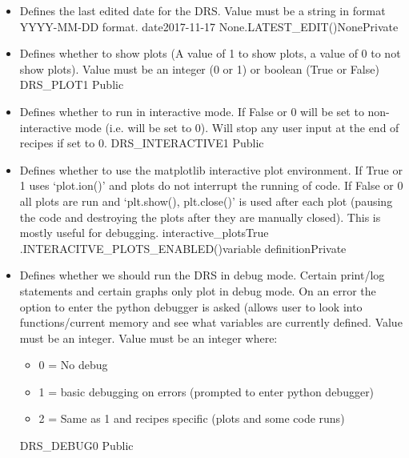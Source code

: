 \begin{itemize}
\ifdevguide
\item {}
{Defines the last edited date for the DRS. Value must be a string in format YYYY-MM-DD format.}
{date}{2017-11-17}
{None}{\spirouConst.LATEST\_EDIT()}{None}{Private}
\fi


\item {} 
{Defines whether to show plots (A value of 1 to show plots, a value of 0 to not show plots). Value must be an integer (0 or 1) or boolean (True or False)}
{DRS\_PLOT}{1}
{\AllRecipes}{\configtxtfile}{\AllRecipes}{Public}

\item {} 
{Defines whether to run in interactive mode. If False or 0 will be set to non-interactive mode (i.e.  will be set to 0). Will stop any user input at the end of recipes if set to 0.}
{DRS\_INTERACTIVE}{1}
{\AllRecipes}{\configtxtfile}{\AllRecipes}{Public}

\ifdevguide
\item {}
{Defines whether to use the matplotlib interactive plot environment. If True or 1 uses `plot.ion()' and plots do not interrupt the running of code. If False or 0 all plots are run and `plt.show(), plt.close()' is used after each plot (pausing the code and destroying the plots after they are manually closed). This is mostly useful for debugging.}
{interactive\_plots}{True}
{\spirouPlot}{\spirouConst.INTERACITVE\_PLOTS\_ENABLED()}{\spirouPlot variable definition}{Private}
\fi

\item {} 
{Defines whether we should run the DRS in debug mode. Certain print/log statements and certain graphs only plot in debug mode. On an error the option to enter the python debugger is asked (allows user to look into functions/current memory and see what variables are currently defined. Value must be an integer. Value must be an integer where:
\begin{itemize}
\item 0 = No debug
\item 1 = basic debugging on errors (prompted to enter python debugger)
\item 2 = Same as 1 and recipes specific (plots and some code runs)
\end{itemize}
}
{DRS\_DEBUG}{0}
{\AllRecipes}{\configtxtfile}{\AllRecipes}{Public}


\end{itemize}
